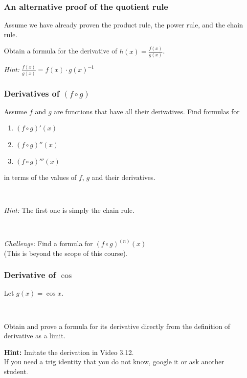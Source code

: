 \documentclass[14pt]{beamer}
\newcommand {\DS} [1] {${\displaystyle #1}$}
\newcommand{\p}{\pause}
\begin{document}
\begin{frame}[t]
\frametitle{An alternative proof of the quotient rule}

Assume we have already proven the product rule, the power rule, and the chain rule.

Obtain a formula for the derivative of \DS{h(x) = \frac{f(x)}{g(x)}}.

\emph{Hint:}  \DS{\frac{f(x)}{g(x)} = f(x) \cdot g(x)^{-1}}

\end{frame}


\begin{frame}
\frametitle{Derivatives of \DS{(f \circ g)}}

Assume $f$ and $g$ are functions that have all their derivatives. 
 Find formulas for
	\begin{enumerate}
		\item  \DS{(f \circ g)'(x)}
		\item  \DS{(f \circ g)''(x)}
		\item	\DS{(f \circ g)'''(x)}
	\end{enumerate}
	
	in terms of the values of $f$, $g$ and their derivatives.
	
	\
	
	\emph{Hint:}  The first one is simply the chain rule.
	
	\ \p
	
	\emph{Challenge:} Find a formula for \DS{(f \circ g)^{(n)}(x)} \\
	(This is beyond the scope of this course).  
\end{frame}


\begin{frame}[t]
\frametitle{Derivative of $\cos$}


Let \DS{g(x) = \cos x.}

\

Obtain and prove a formula for its derivative directly from the definition of derivative as a limit.

\vfill


{\bf Hint:}  Imitate the derivation in Video 3.12. \\  If you need a trig identity that you do not know, google it or ask another student.

\end{frame}
\end{document}
